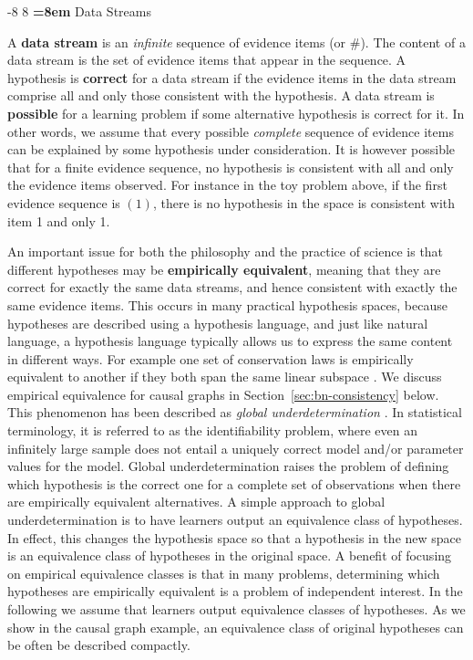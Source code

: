 \documentclass{elsarticle}%
\makeatletter
\renewcommand\subsection{\@startsection {subsection}{1}{\z@}%
  {-8\p@ \@plus -4\p@ \@minus -4\p@}%
                       {8\p@ \@plus 4\p@ \@minus 4\p@}%
                                   {\normalfont\large\bfseries\boldmath
                                   \rightskip=\z@ \@plus 8em\pretolerance=10000 }}
\makeatother
\begin{document}
\subsection{Data Streams} 

A \textbf{data stream} is an {\em infinite} sequence of evidence items (or $\#$). The content of a data stream is the set of evidence items that appear in the sequence. A hypothesis is \textbf{correct} for a data stream if the evidence items in the data stream comprise all and only those consistent with the hypothesis. 
A data stream is \textbf{possible} for a learning problem if some alternative hypothesis is correct for it. In other words, we assume that every possible {\em complete} sequence of evidence items can be explained by some hypothesis under consideration. It is however possible that for a finite evidence sequence, no hypothesis is consistent with all and only the evidence items observed. For instance in the toy problem above, if the first evidence sequence is $(1)$, there is no hypothesis in the space is consistent with item 1 and only 1. 

An important issue for both the philosophy and the practice of science is that different hypotheses may be \textbf{empirically equivalent}, meaning that they are correct for exactly the same data streams, and hence consistent with exactly the same evidence items. This  occurs in many practical hypothesis spaces, because hypotheses are described using a hypothesis language, and just like natural language, a hypothesis language typically allows us to express the same content in different ways. For example one set of conservation laws is empirically equivalent to another if they both span the same linear subspace \cite{Schulte08b}. We discuss empirical equivalence for causal graphs in Section~\ref{sec:bn-consistency} below. 
This phenomenon has been described as {\em global underdetermination} \cite{Kelly1996}. 
In statistical terminology, it is referred to as the identifiability problem, where even an infinitely large sample does not entail a uniquely correct model and/or parameter values for the model. Global underdetermination raises the problem of defining which hypothesis is the correct one for a complete set of observations  when there are empirically equivalent alternatives. A simple approach to global underdetermination is to have learners output an equivalence class of hypotheses. In effect, this changes the hypothesis space so that a hypothesis in the new space is an equivalence class of hypotheses in the original space. A benefit of focusing on empirical equivalence classes is that in many problems, determining which hypotheses are empirically equivalent is a problem of independent interest. In the following we assume that learners output equivalence classes of hypotheses. As we show in the causal graph example, an equivalence class of original hypotheses can be often be described compactly. 
\end{document}
